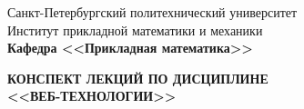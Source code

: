 \documentclass[main.tex]{subfiles}
\begin{document}
\begin{titlepage}
\begin{center}
	\begin{large}
		Санкт-Петербургский политехнический университет\\
		Институт прикладной математики и механики\\
		\textbf{Кафедра <<Прикладная математика>>}\\
	\end{large}
	\vfill
	\Large{\textbf{КОНСПЕКТ ЛЕКЦИЙ ПО ДИСЦИПЛИНЕ \\
			 <<ВЕБ-ТЕХНОЛОГИИ>>}}
\end{center}
\vfill
\begin{figure}[H]
\end{figure}
\vfill
{}
\end{titlepage}
\end{document}

